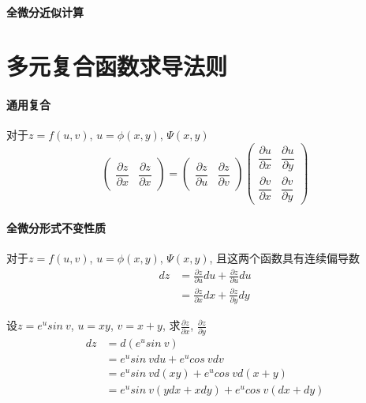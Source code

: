 \documentclass[main.tex]{subfiles}
\begin{document}
\paragraph{全微分近似计算}
\section{多元复合函数求导法则}
\paragraph{通用复合} 对于$z = f(u, v)$, $u = \phi (x, y)$, $\Psi (x, y)$
\begin{equation}
\begin{pmatrix}
    \dfrac{\partial z}{\partial x} & \dfrac{\partial z}{\partial x}
\end{pmatrix}
=
\begin{pmatrix}
    \dfrac{\partial z}{\partial u} & \dfrac{\partial z}{\partial v}
\end{pmatrix}
\begin{pmatrix}
    \dfrac{\partial u}{\partial x} & \dfrac{\partial u}{\partial y} \\[8pt]
    \dfrac{\partial v}{\partial x} & \dfrac{\partial v}{\partial y}
\end{pmatrix}
\tag{多元复合函数通用求导法则}
\end{equation}
\paragraph{全微分形式不变性质} 对于$z = f(u, v)$, $u = \phi (x, y)$, $\Psi (x, y)$, 且这两个函数具有连续偏导数
\begin{align*}
    dz &= \frac{\partial z}{\partial u} du + \frac{\partial z}{\partial u} du \\
       &= \frac{\partial z}{\partial x} dx + \frac{\partial z}{\partial y} dy
\end{align*}

\begin{example}{设$z = e^u sin\ v$, $u = xy$, $v = x + y$, 求$\frac{\partial z}{\partial x}$, $\frac{\partial z}{\partial y}$}
    \begin{align*}
        dz &= d(e^u sin\ v) \\
           &= e^u sin\ v du + e^u cos\ v dv \\
           &= e^u sin\ v d(xy) + e^u cos\ v d(x + y) \\
           &= e^u sin\ v (ydx + xdy) + e^u cos\ v (dx + dy)
    \end{align*}
\end{example}
\end{document}

